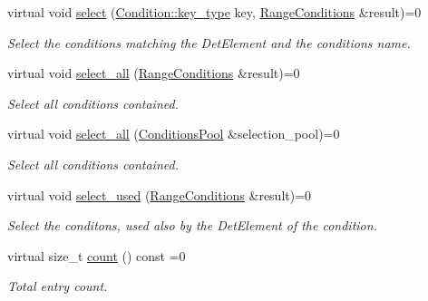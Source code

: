 \begin{DoxyCompactItemize}
virtual void \hyperlink{class_d_d4hep_1_1_conditions_1_1_conditions_pool_a742ca5a35a44037e523a7e654924c5eb}{select} (\hyperlink{class_d_d4hep_1_1_conditions_1_1_condition_a7528efa762e8cc072ef80ea67c3531f9}{Condition::key\_\-type} key, \hyperlink{namespace_d_d4hep_1_1_conditions_ae765f0140a33973a430280f02b6062f4}{RangeConditions} \&result)=0
\begin{DoxyCompactList}\small\item\em Select the conditions matching the DetElement and the conditions name. \item\end{DoxyCompactList}\item 
virtual void \hyperlink{class_d_d4hep_1_1_conditions_1_1_conditions_pool_ab8a4f19ff244225b1d46f6574aa832cb}{select\_\-all} (\hyperlink{namespace_d_d4hep_1_1_conditions_ae765f0140a33973a430280f02b6062f4}{RangeConditions} \&result)=0
\begin{DoxyCompactList}\small\item\em Select all conditions contained. \item\end{DoxyCompactList}\item 
virtual void \hyperlink{class_d_d4hep_1_1_conditions_1_1_conditions_pool_ac500caf2c66d0bad8523d83d569f969c}{select\_\-all} (\hyperlink{class_d_d4hep_1_1_conditions_1_1_conditions_pool}{ConditionsPool} \&selection\_\-pool)=0
\begin{DoxyCompactList}\small\item\em Select all conditions contained. \item\end{DoxyCompactList}\item 
virtual void \hyperlink{class_d_d4hep_1_1_conditions_1_1_conditions_pool_aab6927d2d318a4f16b8704423c6cdd7a}{select\_\-used} (\hyperlink{namespace_d_d4hep_1_1_conditions_ae765f0140a33973a430280f02b6062f4}{RangeConditions} \&result)=0
\begin{DoxyCompactList}\small\item\em Select the conditons, used also by the DetElement of the condition. \item\end{DoxyCompactList}\item 
virtual size\_\-t \hyperlink{class_d_d4hep_1_1_conditions_1_1_conditions_pool_a40326e9b162960c46e69cbdb451526d0}{count} () const =0
\begin{DoxyCompactList}\small\item\em Total entry count. \item\end{DoxyCompactList}\end{DoxyCompactItemize}
